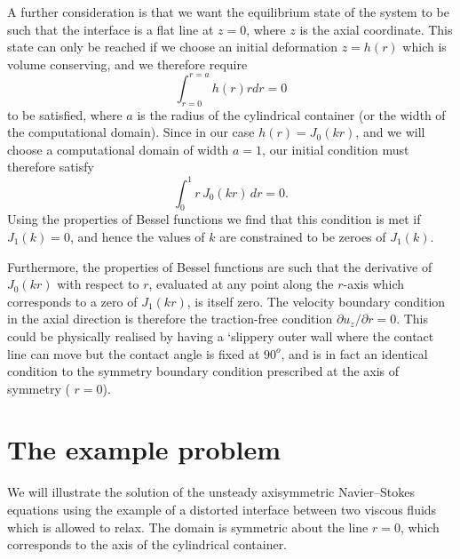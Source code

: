 A further consideration is that we want the equilibrium state of the system to be such that the interface is a flat line at $ z=0 $, where $ z $ is the axial coordinate. This state can only be reached if we choose an initial deformation $ z=h(r) $ which is volume conserving, and we therefore require \[ \int_{r=0}^{r=a} h(r) r dr = 0 \] to be satisfied, where $ a $ is the radius of the cylindrical container (or the width of the computational domain). Since in our case $ h(r) = J_0(kr) $, and we will choose a computational domain of width $ a=1 $, our initial condition must therefore satisfy \[ \int_0^1 r \, J_0(kr) \, dr = 0. \] Using the properties of Bessel functions we find that this condition is met if $ J_1(k) = 0 $, and hence the values of $ k $ are constrained to be zeroes of $ J_1(k) $.

Furthermore, the properties of Bessel functions are such that the derivative of $ J_0(kr) $ with respect to $ r $, evaluated at any point along the $ r $-\/axis which corresponds to a zero of $ J_1(kr) $, is itself zero. The velocity boundary condition in the axial direction is therefore the traction-\/free condition $ \partial u_z / \partial r = 0 $. This could be physically realised by having a `slippery\textquotesingle{} outer wall where the contact line can move but the contact angle is fixed at $ 90^o $, and is in fact an identical condition to the symmetry boundary condition prescribed at the axis of symmetry ( $ r=0 $).



 

\hypertarget{index_example_problem}{}\section{The example problem}\label{index_example_problem}
We will illustrate the solution of the unsteady axisymmetric Navier--Stokes equations using the example of a distorted interface between two viscous fluids which is allowed to relax. The domain is symmetric about the line $ r=0 $, which corresponds to the axis of the cylindrical container.

